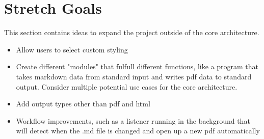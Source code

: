 \documentclass[12pt]{article}
\begin{document}
\section{Stretch Goals}
	This section contains ideas to expand the project outside of the core architecture.
	\begin{itemize}
		\item Allow users to select custom styling
		\item Create different "modules" that fulfull different functions, like a program that takes markdown data from standard input and writes pdf data to standard output. Consider multiple potential use cases for the core architecture.
		\item Add output types other than pdf and html
		\item Workflow improvements, such as a listener running in the background that will detect when the .md file is changed and open up a new pdf automatically
	\end{itemize}
%
%
%
%
%
%
%
\end{document}
